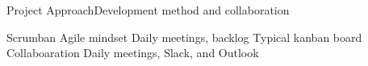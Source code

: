\begin{frame}{Project Approach}{Development method and collaboration}
\begin{outline}
\0 Scrumban
    \1 Agile mindset
    \1 Daily meetings, backlog
    \1 Typical kanban board
\vspace{0.2cm}
\0 Collaboaration
    \1 Daily meetings, Slack, and Outlook
\end{outline}
\end{frame}


